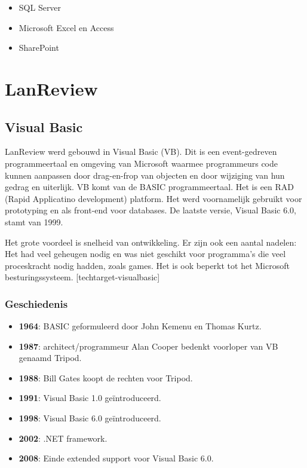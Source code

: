 \begin{itemize}
    \item SQL Server
    \item Microsoft Excel en Access
    \item SharePoint
\end{itemize}

\section{LanReview}

\subsection{Visual Basic}

LanReview werd gebouwd in Visual Basic (VB). Dit is een event-gedreven programmeertaal en omgeving van Microsoft waarmee programmeurs code kunnen aanpassen door drag-en-frop van objecten en door wijziging van hun gedrag en uiterlijk.  VB komt van de BASIC programmeertaal. Het is een RAD (Rapid Applicatino development) platform. Het werd voornamelijk gebruikt voor prototyping en als front-end voor databases. De laatste versie, Visual Basic 6.0, stamt van 1999.

Het grote voordeel is snelheid van ontwikkeling. Er zijn ook een aantal nadelen:
Het had veel geheugen nodig en was niet geschikt voor programma's die veel proceskracht nodig hadden, zoals games. Het is ook beperkt tot het Microsoft besturingssysteem. [techtarget-visualbasic]

\subsubsection{Geschiedenis}

\begin{itemize}
    \item \textbf{1964}: BASIC geformuleerd door John Kemenu en Thomas Kurtz.
    \item \textbf{1987}: architect/programmeur Alan Cooper bedenkt voorloper van VB genaamd Tripod.
    \item \textbf{1988}: Bill Gates koopt de rechten voor Tripod.
    \item \textbf{1991}: Visual Basic 1.0 geïntroduceerd.
    \item \textbf{1998}: Visual Basic 6.0 geïntroduceerd.
    \item \textbf{2002}: .NET framework.
    \item \textbf{2008}: Einde extended support voor Visual Basic 6.0.
\end{itemize}

